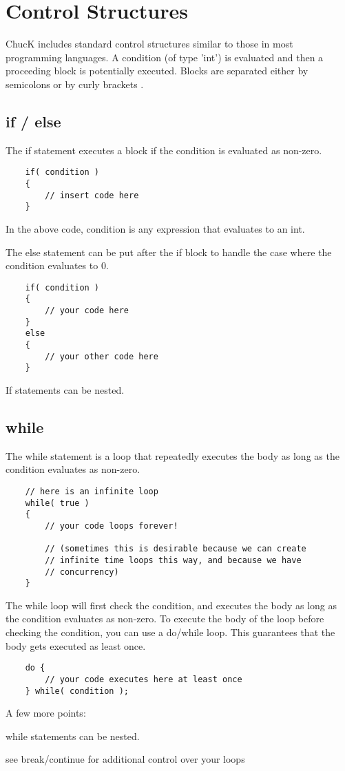 \chapter{Control Structures}

ChucK includes standard control structures similar to those in most programming languages. A condition (of type 'int') is evaluated and then a proceeding block is potentially executed. Blocks are separated either by semicolons or by curly brackets {}.

 

\section{if / else}

The if statement executes a block if the condition is evaluated as non-zero.
\begin{verbatim}
    if( condition )
    {
        // insert code here
    }
\end{verbatim}
 In the above code, condition is any expression that evaluates to an int.

The else statement can be put after the if block to handle the case where the condition evaluates to 0.
\begin{verbatim}
    if( condition )
    {
        // your code here
    }
    else
    {
        // your other code here
    }
\end{verbatim}

If statements can be nested.
 

\section{while}

The while statement is a loop that repeatedly executes the body as long as the condition evaluates as non-zero.
\begin{verbatim}
    // here is an infinite loop
    while( true )
    {
        // your code loops forever!

        // (sometimes this is desirable because we can create
        // infinite time loops this way, and because we have
        // concurrency)
    } 
\end{verbatim}

The while loop will first check the condition, and executes the body as long as the condition evaluates as non-zero. To execute the body of the loop before checking the condition, you can use a do/while loop. This guarantees that the body gets executed as least once.
\begin{verbatim}
    do {
        // your code executes here at least once
    } while( condition );
\end{verbatim}
 A few more points:
\begin{chuckitemize}
\item while statements can be nested.
\item see break/continue for additional control over your loops
\end{chuckitemize}

